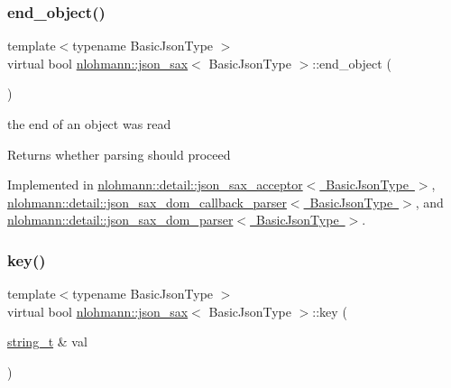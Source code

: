 \mbox{\label{structnlohmann_1_1json__sax_ad0c722d53ff97be700ccf6a9468bd456}} 
\subsubsection{\texorpdfstring{end\+\_\+object()}{end\_object()}}
{\footnotesize\ttfamily template$<$typename Basic\+Json\+Type $>$ \\
virtual bool \mbox{\hyperlink{structnlohmann_1_1json__sax}{nlohmann\+::json\+\_\+sax}}$<$ Basic\+Json\+Type $>$\+::end\+\_\+object (\begin{DoxyParamCaption}{ }\end{DoxyParamCaption})\hspace{0.3cm}{\ttfamily [pure virtual]}}



the end of an object was read 

\begin{DoxyReturn}{Returns}
whether parsing should proceed 
\end{DoxyReturn}


Implemented in \mbox{\hyperlink{classnlohmann_1_1detail_1_1json__sax__acceptor_aec85a55e7febe5edef2235a55ce7b0bc}{nlohmann\+::detail\+::json\+\_\+sax\+\_\+acceptor$<$ Basic\+Json\+Type $>$}}, \mbox{\hyperlink{classnlohmann_1_1detail_1_1json__sax__dom__callback__parser_af45184ab12f7b9afd7cf5d8616731395}{nlohmann\+::detail\+::json\+\_\+sax\+\_\+dom\+\_\+callback\+\_\+parser$<$ Basic\+Json\+Type $>$}}, and \mbox{\hyperlink{classnlohmann_1_1detail_1_1json__sax__dom__parser_a0ed3d660d7d97411fdebeba233b4d994}{nlohmann\+::detail\+::json\+\_\+sax\+\_\+dom\+\_\+parser$<$ Basic\+Json\+Type $>$}}.

\mbox{\label{structnlohmann_1_1json__sax_a2e0c7ecd80b18d18a8cc76f71cfc2028}} 
\subsubsection{\texorpdfstring{key()}{key()}}
{\footnotesize\ttfamily template$<$typename Basic\+Json\+Type $>$ \\
virtual bool \mbox{\hyperlink{structnlohmann_1_1json__sax}{nlohmann\+::json\+\_\+sax}}$<$ Basic\+Json\+Type $>$\+::key (\begin{DoxyParamCaption}\item[{\mbox{\hyperlink{structnlohmann_1_1json__sax_ae01977a9f3c5b3667b7a2929ed91061e}{string\+\_\+t}} \&}]{val }\end{DoxyParamCaption})\hspace{0.3cm}{\ttfamily [pure virtual]}}



